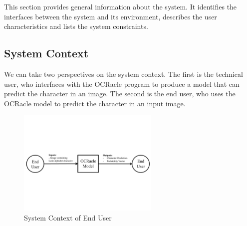 \documentclass[12pt]{article}
\begin{document}
This section provides general information about the system.  It identifies the
interfaces between the system and its environment, describes the user
characteristics and lists the system constraints.

\subsection{System Context}


We can take two perspectives on the system context. The first is the technical
user, who interfaces with the OCRacle program to produce a model that can
predict the character in an image. The second is the end user, who uses the
OCRacle model to predict the character in an input image.

\begin{figure}[h!]
  \begin{center}
    \includegraphics[page=2, width=0.6\textwidth]{SystemContextFigure}
    \caption{System Context of End User}
    \label{Fig_SystemContext2} 
  \end{center}
\end{figure}
\end{document}
